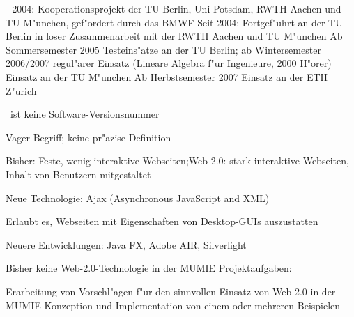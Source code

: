 \documentclass{article}
\begin{document}
\pagebreak


\begin{mylist}

 - 2004: Kooperationsprojekt der TU Berlin, Uni Potsdam, RWTH
        Aachen und TU M"unchen, gef"ordert durch das BMWF
\pitem Seit 2004: Fortgef"uhrt an der TU Berlin in loser Zusammenarbeit mit
       der RWTH Aachen und TU M"unchen
\pitem Ab Sommersemester 2005 Testeins"atze an der TU Berlin; ab Wintersemester
       2006/2007 regul"arer Einsatz (Lineare Algebra f"ur Ingenieure, 2000 H"orer)
\pitem Einsatz an der TU M"unchen
\pitem Ab Herbstsemester 2007 Einsatz an der ETH Z"urich

\end{mylist}

\pagebreak


\begin{mylist}

\pitem {}\grqq\ ist keine Software-Versionsnummer

\pitem Vager Begriff; keine pr"azise Definition


\pitem Bisher: Feste, wenig interaktive Webseiten;\pause Web 2.0: stark
interaktive Webseiten, Inhalt von Benutzern mitgestaltet

\pitem Neue Technologie: Ajax \pause (Asynchronous JavaScript and XML)

\pitem Erlaubt es, Webseiten mit Eigenschaften von Desktop-GUIs auszustatten

\pitem Neuere Entwicklungen: Java FX, Adobe AIR, Silverlight

\end{mylist}

\pagebreak


\begin{mylist}
\pitem Bisher keine Web-2.0-Technologie in der MUMIE
\pitem Projektaufgaben:
\begin{mylist}[\mylabelitemii]
  \pitem Erarbeitung von Vorschl"agen f"ur den sinnvollen Einsatz von Web 2.0
         in der MUMIE
  \pitem Konzeption und Implementation von einem oder mehreren Beispielen
\end{mylist}
\end{mylist}
\end{document}
